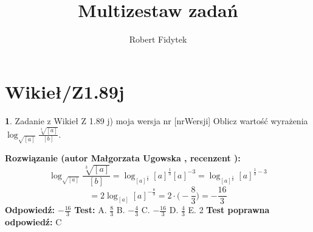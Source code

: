 \documentclass[12pt, a4paper]{article}
\title{Multizestaw zadań}
\author{Robert Fidytek}
\date{}
\theoremstyle{definition} %
\newtheorem{zad}{}
\newcommand{\kategoria}[1]{\section{#1}} %
\newcommand{\zadStart}[1]{\begin{zad}#1\newline} %
\newcommand{\zadStop}{\end{zad}}   %
\newcommand{\rozwStart}[2]{\noindent \textbf{Rozwiązanie (autor #1 , recenzent #2): }\newline} %
\newcommand{\rozwStop}{\newline}                                            %
\newcommand{\odpStart}{\noindent \textbf{Odpowiedź:}\newline}    %
\newcommand{\odpStop}{\newline}                                             %
\newcommand{\testStart}{\noindent \textbf{Test:}\newline} %
\newcommand{\testStop}{\newline} %
\newcommand{\kluczStart}{\noindent \textbf{Test poprawna odpowiedź:}\newline} %
\newcommand{\kluczStop}{\newline} %
\begin{document}
\maketitle


\kategoria{Wikieł/Z1.89j}
\zadStart{Zadanie z Wikieł Z 1.89 j) moja wersja nr [nrWersji]}
Oblicz warto\'sć wyrażenia $\log_{\sqrt{[a]}}{\frac{\sqrt[3]{[a]}}{[b]}}$.
\zadStop
\rozwStart{Małgorzata Ugowska}{}
$$\log_{\sqrt{[a]}}{\frac{\sqrt[3]{[a]}}{[b]}} = \log_{[a]^{\frac{1}{2}}}{[a]^{\frac{1}{3}}[a]^{-3}} = \log_{[a]^{\frac{1}{2}}}{[a]^{\frac{1}{3}-3}}$$
$$= 2 \log_{[a]}{[a]^{-\frac{8}{3}}} = 2 \cdot \big(-\frac{8}{3}\big) = -\frac{16}{3}$$
\rozwStop
\odpStart
$-\frac{16}{3}$
\odpStop
\testStart
A. $\frac{8}{3}$
B. $-\frac{4}{3}$
C. $-\frac{16}{3}$
D. $\frac{4}{3}$
E. 2
\testStop
\kluczStart
C
\kluczStop
\end{document}
